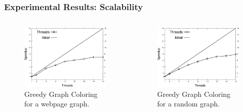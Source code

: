 \documentclass{beamer}
\begin{document}
\begin{frame}[fragile]
   \frametitle{Experimental Results: Scalability}
   \begin{columns}[t]
      \begin{figure}[b]
         \includegraphics[width=\textwidth]{../speedup_greedy-graph-coloring-search_engines.pdf}
         \caption{Greedy Graph Coloring for a webpage graph.}
      \end{figure}
      \begin{figure}[b]
         \includegraphics[width=\textwidth]{../speedup_greedy-graph-coloring-2000.pdf}
         \caption{Greedy Graph Coloring for a random graph.}
      \end{figure}
   \end{columns}
\end{frame}
\end{document}
